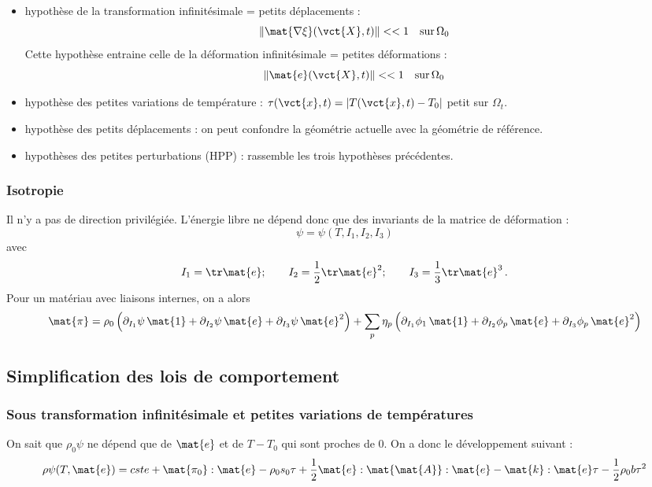 \documentclass[11pt,a4paper]{article}
\begin{document}
\begin{itemize}
	\item hypothèse de la transformation infinitésimale = petits déplacements :
	\begin{equation}
	\|\mat{\nabla\xi}(\vct{X},t)\|<<1\quad\textrm{sur\,}\Omega_0
	\end{equation}
	Cette hypothèse entraine celle de la déformation infinitésimale = petites déformations :
	\begin{equation}
	\|\mat{e}(\vct{X},t)\|<<1\quad \textrm{sur\,}\Omega_0
	\end{equation}
	
	\item hypothèse des petites variations de température : $\tau(\vct{x},t)=|T(\vct{x},t)-T_0|$ petit sur $\Omega_t$.
	
	\item hypothèse des petits déplacements : on peut confondre la géométrie actuelle avec la géométrie de référence.
	
	\item hypothèses des petites perturbations (HPP) : rassemble les trois hypothèses précédentes.
\end{itemize}

\subsubsection{Isotropie} 
Il n'y a pas de direction privilégiée. L'énergie libre ne dépend donc que des invariants de la matrice de déformation :
\[\psi=\psi(T,I_1,I_2,I_3)\]
avec \[I_1=\tr\mat{e};\qquad I_2=\frac{1}{2}\tr \mat{e}^2; \qquad I_3=\frac{1}{3}\tr \mat{e}^3\,.\]
Pour un matériau avec liaisons internes, on a alors 
\begin{equation}
\mat{\pi}=\rho_0\left(\partial_{I_1}\psi \,\mat{1}+\partial_{I_2}\psi\,\mat{e}+\partial_{I_3}\psi\,\mat{e}^2\right)+\sum_p \eta_p\left(\partial_{I_1}\phi_1 \,\mat{1}+\partial_{I_2}\phi_p\,\mat{e}+\partial_{I_3}\phi_p\,\mat{e}^2\right)
\end{equation}

\subsection{Simplification des lois de comportement}

\subsubsection{Sous transformation infinitésimale et petites variations de températures}
On sait que $\rho_0 \psi$ ne dépend que de $\mat{e}$ et de $T-T_0$ qui sont proches de 0. On a donc le développement suivant :
\begin{equation}
\rho\psi(T,\mat{e})=cste+\mat{\pi_0}:\mat{e}-\rho_0s_0\tau+\frac{1}{2}\mat{e}:\mat{\mat{A}}:\mat{e}-\mat{k}:\mat{e}\tau-\frac{1}{2}\rho_0b\tau^2
\end{equation}
\end{document}
